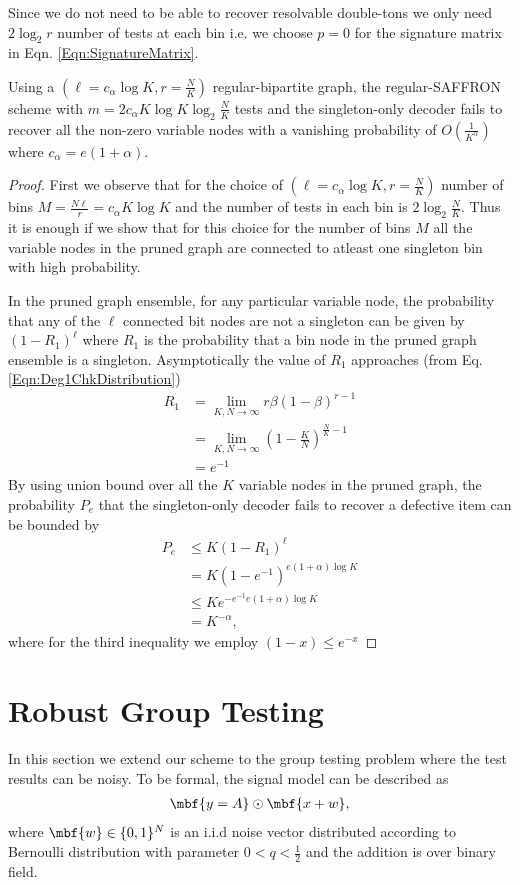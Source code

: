 \documentclass[conference,twocolumn]{IEEEtran}
\begin{document}
Since we do not need to be able to recover resolvable double-tons we only need $2\log_2 r$ number of tests at each bin i.e. we choose $p=0$ for the signature matrix in Eqn. \eqref{Eqn:SignatureMatrix}.
\begin{theorem}
Using a $(\ell=c_\alpha \log K,r=\frac{N}{K})$ regular-bipartite graph, the regular-SAFFRON scheme with $m=2c_\alpha K\log K \log_2 \frac{N}{K}$ tests and the singleton-only decoder fails to recover all the non-zero variable nodes with a vanishing probability of $O(\frac{1}{K^{\alpha}})$ where $c_\alpha=e(1+\alpha)$.
\end{theorem}
\begin{proof}
First we observe that for the choice of $(\ell=c_\alpha \log K,r=\frac{N}{K})$ number of bins $M=\frac{N\ell}{r}=c_\alpha K \log K$ and the number of tests in each bin is $2\log_2 \frac{N}{K}$. Thus it is enough if we show that for this choice for the number of bins $M$ all the variable nodes in the pruned graph are connected to atleast one singleton bin with high probability.

In the pruned graph ensemble, for any particular variable node, the probability that any of the $\ell$ connected bit nodes are not a singleton can be given by $(1-R_1)^\ell$ where $R_1$ is the probability that a bin node in the pruned graph ensemble is a singleton. Asymptotically the value of $R_1$ approaches (from Eq. \ref{Eqn:Deg1ChkDistribution})
\begin{align*}
R_1&=\lim _{K,N\rightarrow\infty}r\beta(1-\beta)^{r-1}\\
     &=\lim _{K,N\rightarrow\infty}\left(1-\frac{K}{N}\right)^{\frac{N}{K}-1}\\
     &= e^{-1}
\end{align*} 
By using union bound over all the $K$ variable nodes in the pruned graph, the probability $P_e$ that the singleton-only decoder fails to recover a defective item can be bounded by
\begin{align*}
P_e&\leq K(1-R_1)^\ell \\
&=K\left(1-e^{-1}\right)^{e(1+\alpha)\log K}\\
&\leq Ke^{-e^{-1}e(1+\alpha)\log K}\\
&=K^{-\alpha},
\end{align*}
where for the third inequality we employ $(1-x)\leq e^{-x}$
\end{proof}


\section{Robust Group Testing}
\label{Sec:NoisyGroupTesting}
In this section we extend our scheme to the group testing problem where the test results can be noisy. To be formal, the signal model can be described as 
\begin{align*}
\mbf{y=A}\odot \mbf{x+w},
\end{align*}
where $\mbf{w}\in\{0,1\}^N$ is an i.i.d noise vector distributed according to Bernoulli distribution with parameter $0<q<\frac{1}{2}$ and the addition is over binary field.
\end{document}
